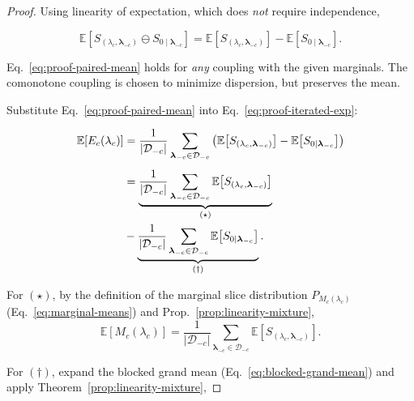 \begin{proof}
Using linearity of expectation, which does \emph{not} require independence,

{\small
\begin{equation}
\label{eq:proof-paired-mean}
\mathbb{E}\!\left[
S_{(\lambda_c,\boldsymbol{\lambda}_{-c})}\ominus S_{0\mid \boldsymbol{\lambda}_{-c}}
\right]
=
\mathbb{E}\!\left[S_{(\lambda_c,\boldsymbol{\lambda}_{-c})}\right]
-
\mathbb{E}\!\left[S_{0\mid \boldsymbol{\lambda}_{-c}}\right].
\end{equation}
}

Eq.~\eqref{eq:proof-paired-mean} holds for \emph{any} coupling with
the given marginals. The comonotone coupling is chosen to minimize dispersion,
but preserves the mean.

Substitute Eq.~\eqref{eq:proof-paired-mean} into Eq.~\eqref{eq:proof-iterated-exp}:

{\small
\begin{align}
\mathbb{E}\!\left[E_c(\lambda_c)\right]
&=
\frac{1}{|\mathcal{D}_{-c}|}
\sum_{\boldsymbol{\lambda}_{-c}\in\mathcal{D}_{-c}}
\left(
\mathbb{E}\!\left[S_{(\lambda_c,\boldsymbol{\lambda}_{-c})}\right]
-
\mathbb{E}\!\left[S_{0\mid \boldsymbol{\lambda}_{-c}}\right]
\right) \notag\\[4pt]
&=
\underbrace{
\frac{1}{|\mathcal{D}_{-c}|}
\sum_{\boldsymbol{\lambda}_{-c}\in\mathcal{D}_{-c}}
\mathbb{E}\!\left[S_{(\lambda_c,\boldsymbol{\lambda}_{-c})}\right]
}_{(\star)} \\
&-
\underbrace{
\frac{1}{|\mathcal{D}_{-c}|}
\sum_{\boldsymbol{\lambda}_{-c}\in\mathcal{D}_{-c}}
\mathbb{E}\!\left[S_{0\mid \boldsymbol{\lambda}_{-c}}\right]
}_{(\dagger)}.
\label{eq:proof-split}
\end{align}
}

For $(\star)$, by the definition of the marginal slice distribution
$P_{M_c(\lambda_c)}$ (Eq.~\eqref{eq:marginal-means}) and Prop.~\ref{prop:linearity-mixture},
\[
\mathbb{E}[M_c(\lambda_c)]
=
\frac{1}{|\mathcal{D}_{-c}|}
\sum_{\boldsymbol{\lambda}_{-c}\in\mathcal{D}_{-c}}
\mathbb{E}\!\left[S_{(\lambda_c,\boldsymbol{\lambda}_{-c})}\right].
\]

For $(\dagger)$, expand the blocked grand mean
(Eq.~\eqref{eq:blocked-grand-mean}) and apply Theorem~\ref{prop:linearity-mixture},


\end{proof}

